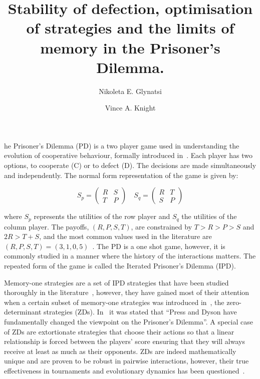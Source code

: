 \documentclass[9pt,twocolumn,twoside,lineno]{pnas-new}
\title{Stability of defection, optimisation of strategies and the limits of
memory in the Prisoner's Dilemma.}
\author[a, 2]{Nikoleta E. Glynatsi}
\author[a]{Vince A. Knight}
\affil[a]{Cardiff University, School of Mathematics, Cardiff, United Kingdom}
\begin{document}
\maketitle
\thispagestyle{firststyle}

he Prisoner's Dilemma (PD) is a two player game used in understanding the
evolution of cooperative behaviour, formally introduced in~\cite{Flood1958}.
Each player has two options, to cooperate (C) or to defect (D). The decisions
are made simultaneously and independently. The normal form representation of the
game is given by:

\begin{equation}\label{equ:pd_definition}
    S_p =
    \begin{pmatrix}
        R & S  \\
        T & P
    \end{pmatrix}
    \quad
    S_q =
    \begin{pmatrix}
        R & T  \\
        S & P
    \end{pmatrix}
\end{equation}

where \(S_p\) represents the utilities of the row player and \(S_q\) the
utilities of the column player. The payoffs, \((R, P, S, T)\), are constrained
by \(T > R > P > S\) and \(2R > T + S\), and the most common values used in the
literature are \((R, P, S, T) = (3, 1, 0, 5)\)~\cite{Axelrod1981}.
The PD is a one shot game, however, it is commonly studied in a manner where the
history of the interactions matters. The repeated form of the game is called the
Iterated Prisoner's Dilemma (IPD).

Memory-one strategies are a set of IPD strategies that have been
studied thoroughly in the literature~\cite{Nowak1990, Nowak1993}, however, they have gained
most of their attention when a certain subset of memory-one strategies was
introduced in~\cite{Press2012}, the zero-determinant strategies (ZDs). In~\cite{Stewart2012} it
was stated that ``Press and Dyson have fundamentally changed the viewpoint on
the Prisoner's Dilemma''.
A special case of ZDs are extortionate strategies that choose their actions so that a linear relationship is forced
between the players' score ensuring that they will always
receive at least as much as their opponents. ZDs are
indeed mathematically unique and are proven to be robust in pairwise
interactions, however, their true effectiveness in tournaments and
evolutionary dynamics has been questioned~\cite{adami2013, Hilbe2013b,
Hilbe2013, Hilbe2015, Knight2018, Harper2015}.
\end{document}
